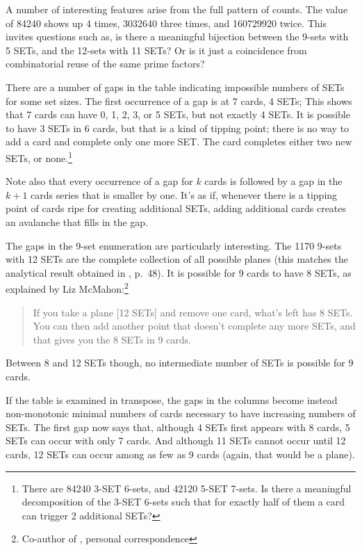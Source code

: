 \documentclass[10pt]{amsart}
\begin{document}
A number of interesting features arise from the full pattern of counts. The
value of 84240 shows up 4 times, 3032640 three times, and 160729920 twice. This
invites questions such as, is there a meaningful bijection between the 9-sets
with 5 SETs, and the 12-sets with 11 SETs? Or is it just a coincidence from
combinatorial reuse of the same prime factors?


There are a number of gaps in the table indicating impossible numbers of SETs
for some set sizes. The first occurrence of a gap is at 7 cards, 4 SETs; This
shows that 7 cards can have 0, 1, 2, 3, or 5 SETs, but not exactly 4 SETs. It is
possible to have 3 SETs in 6 cards, but that is a kind of tipping point; there
is no way to add a  card and complete only one more SET. The  card
completes either two new SETs, or none.\footnote{There are 84240 3-SET 6-sets,
  and 42120 5-SET 7-sets. Is there a meaningful decomposition of the 3-SET
  6-sets such that for exactly half of them a  card can trigger 2
  additional SETs?}

Note also that every occurrence of a gap for $k$ cards is followed by a gap in
the $k+1$ cards series that is smaller by one. It's as if, whenever there is a
tipping point of cards ripe for creating additional SETs, adding additional
cards creates an avalanche that fills in the gap.

The gaps in the 9-set enumeration are particularly interesting. The 1170 9-sets
with 12 SETs are the complete collection of all possible planes (this matches
the analytical result obtained in \cite{JOS}, p.~48). It is possible for 9 cards
to have 8 SETs, as explained by Liz McMahon:\footnote{Co-author of \cite{JOS},
  personal correspondence}
\begin{quote}
If you take a plane [12 SETs] and remove one card, what's left has 8 SETs.  You
can then add another point that doesn't complete any more SETs, and that gives
you the 8 SETs in 9 cards.
\end{quote}
Between 8 and 12 SETs though, no intermediate number of SETs is possible for 9
cards.

If the table is examined in transpose, the gaps in the columns become instead
non-monotonic minimal numbers of cards necessary to have increasing numbers of
SETs. The first gap now says that, although 4 SETs first appears with 8 cards, 5
SETs can occur with only 7 cards. And although 11 SETs cannot occur until 12
cards, 12 SETs can occur among as few as 9 cards (again, that would be a plane).
\end{document}
